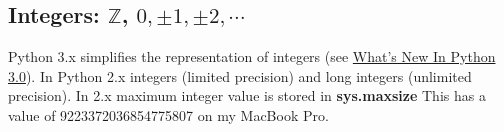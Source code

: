 \subsection{Integers: $\mathbb{Z}$, $0,\pm 1, \pm 2, \cdots$}

Python 3.x simplifies the representation of integers (see \href{https://docs.python.org/3/whatsnew/3.0.html#integers}{What's New In Python 3.0}). In Python 2.x integers (limited precision) and long integers (unlimited precision). In 2.x maximum integer value is stored in \textbf{sys.maxsize}
This has a value of 9223372036854775807 on my MacBook Pro.

